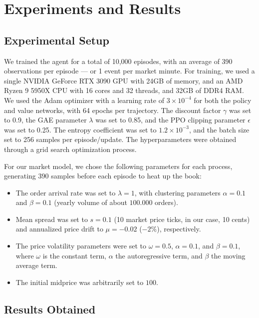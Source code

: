 \section{Experiments and Results}
\label{sec:realized-experiments-and-results}

\subsection{Experimental Setup}
\label{subsec:experiment-setup}

We trained the agent for a total of 10,000 episodes, with an average of 390 observations per episode --- or 1 event per market minute.
For training, we used a single NVIDIA GeForce RTX 3090 GPU with 24GB of memory, and an AMD Ryzen 9 5950X CPU with 16 cores and 32 threads,
and 32GB of DDR4 RAM.
We used the Adam optimizer with a learning rate of $3 \times 10^{-4}$ for both the policy and value networks, with 64 epochs per trajectory.
The discount factor $\gamma$ was set to 0.9, the GAE parameter $\lambda$ was set to 0.85, and the PPO clipping parameter $\epsilon$ was set to 0.25.
The entropy coefficient was set to $1.2\times10^{-3}$, and the batch size set to 256 samples per episode/update.
The hyperparameters were obtained through a grid search optimization process.

For our market model, we chose the following parameters for each process, generating 390 samples before each episode to heat up the book:
\begin{itemize}
    \item The order arrival rate was set to $\lambda = 1$, with clustering parameters $\alpha = 0.1$ and $\beta = 0.1$ (yearly volume of about $100.000$ orders).
    \item Mean spread was set to $s = 0.1$ (10 market price ticks, in our case, 10 cents) and annualized price drift to $\mu = -0.02$ ($-2\%$), respectively.
    \item The price volatility parameters were set to $\omega = 0.5$, $\alpha = 0.1$, and $\beta = 0.1$,
    where $\omega$ is the constant term, $\alpha$ the autoregressive term, and $\beta$ the moving average term.
    \item The initial midprice was arbitrarily set to $100$.
\end{itemize}

\subsection{Results Obtained}
\label{subsec:experiment-results}


